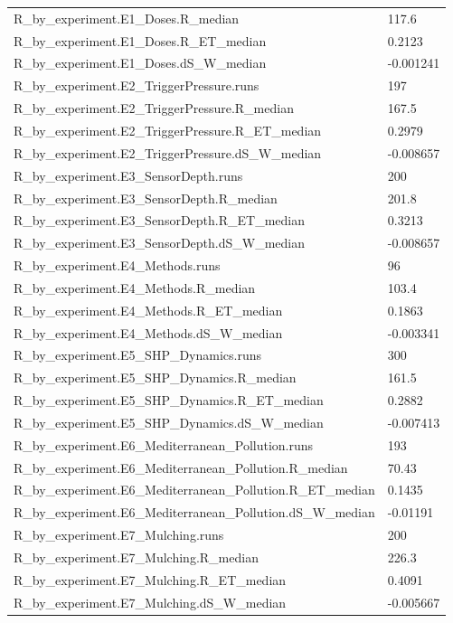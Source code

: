 {\begin{longtable}{p{}p{}}
{}R\_by\_experiment.E1\_Doses.R\_median & 117.6\\
{}R\_by\_experiment.E1\_Doses.R\_ET\_median & 0.2123\\
{}R\_by\_experiment.E1\_Doses.dS\_W\_median & -0.001241\\
{}R\_by\_experiment.E2\_TriggerPressure.runs & 197\\
{}R\_by\_experiment.E2\_TriggerPressure.R\_median & 167.5\\
{}R\_by\_experiment.E2\_TriggerPressure.R\_ET\_median & 0.2979\\
{}R\_by\_experiment.E2\_TriggerPressure.dS\_W\_median & -0.008657\\
{}R\_by\_experiment.E3\_SensorDepth.runs & 200\\
{}R\_by\_experiment.E3\_SensorDepth.R\_median & 201.8\\
{}R\_by\_experiment.E3\_SensorDepth.R\_ET\_median & 0.3213\\
{}R\_by\_experiment.E3\_SensorDepth.dS\_W\_median & -0.008657\\
{}R\_by\_experiment.E4\_Methods.runs & 96\\
{}R\_by\_experiment.E4\_Methods.R\_median & 103.4\\
{}R\_by\_experiment.E4\_Methods.R\_ET\_median & 0.1863\\
{}R\_by\_experiment.E4\_Methods.dS\_W\_median & -0.003341\\
{}R\_by\_experiment.E5\_SHP\_Dynamics.runs & 300\\
{}R\_by\_experiment.E5\_SHP\_Dynamics.R\_median & 161.5\\
{}R\_by\_experiment.E5\_SHP\_Dynamics.R\_ET\_median & 0.2882\\
{}R\_by\_experiment.E5\_SHP\_Dynamics.dS\_W\_median & -0.007413\\
{}R\_by\_experiment.E6\_Mediterranean\_Pollution.runs & 193\\
{}R\_by\_experiment.E6\_Mediterranean\_Pollution.R\_median & 70.43\\
{}R\_by\_experiment.E6\_Mediterranean\_Pollution.R\_ET\_median & 0.1435\\
{}R\_by\_experiment.E6\_Mediterranean\_Pollution.dS\_W\_median & -0.01191\\
{}R\_by\_experiment.E7\_Mulching.runs & 200\\
{}R\_by\_experiment.E7\_Mulching.R\_median & 226.3\\
{}R\_by\_experiment.E7\_Mulching.R\_ET\_median & 0.4091\\
{}R\_by\_experiment.E7\_Mulching.dS\_W\_median & -0.005667\\

\end{longtable}}

